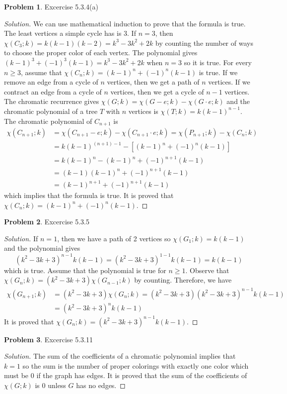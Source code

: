 \documentclass[12pt]{article}
\theoremstyle{definition}
\newtheorem{problem}{Problem}
\newenvironment*{solution}{\begin{proof}[Solution]}{\end{proof}}
\begin{document}
\begin{problem}
    Excercise 5.3.4(a)
\end{problem}
\begin{solution}
    We can use mathematical induction to prove that the formula is true.
    The least vertices a simple cycle has is 3.
    If \(n=3\), then \(\chi(C_3;k)=k(k-1)(k-2)=k^3-3k^2+2k\) by counting the
    number of ways to choose the proper color of each vertex.
    The polynomial gives \((k-1)^3+(-1)^3(k-1)=k^3-3k^2+2k\) when \(n=3\) so
    it is true.
    For every \(n\geq3\), assume that \(\chi(C_n;k) = (k-1)^n+(-1)^n(k-1)\) is
    true.
    If we remove an edge from a cycle of \(n\) vertices, then we get a path of
    \(n\) vertices.
    If we contract an edge from a cycle of \(n\) vertices, then we get a cycle
    of \(n-1\) vertices.
    The chromatic recurrence gives \(\chi(G;k)=\chi(G-e;k)-\chi(G\cdot e;k)\)
    and the chromatic polynomial of a tree \(T\) with \(n\) vertices is
    \(\chi(T;k)=k(k-1)^{n-1}\).
    The chromatic polynomial of \(C_{n+1}\) is
    \begin{align*}
        \chi(C_{n+1};k) &= \chi(C_{n+1}-e;k) - \chi(C_{n+1}\cdot e;k)
        = \chi(P_{n+1};k) - \chi(C_{n};k) \\
        &= k(k-1)^{(n+1)-1} - [(k-1)^n+(-1)^n(k-1)] \\
        &= k(k-1)^n - (k-1)^n + (-1)^{n+1}(k-1) \\
        &= (k-1)(k-1)^n + (-1)^{n+1}(k-1) \\
        &= (k-1)^{n+1} + (-1)^{n+1}(k-1)
    \end{align*}
    which implies that the formula is true.
    It is proved that \(\chi(C_n;k) = (k-1)^n+(-1)^n(k-1)\).
\end{solution}

\begin{problem}
    Excercise 5.3.5
\end{problem}
\begin{solution}
    If \(n=1\), then we have a path of 2 vertices so \(\chi(G_1;k)=k(k-1)\)
    and the polynomial gives
    \[(k^2-3k+3)^{n-1}k(k-1) = (k^2-3k+3)^{1-1}k(k-1) = k(k-1)\]
    which is true.
    Assume that the polynomial is true for \(n\geq1\).
    Observe that \(\chi(G_n;k)=(k^2-3k+3)\chi(G_{n-1};k)\) by counting.
    Therefore, we have
    \begin{align*}
        \chi(G_{n+1};k) &= (k^2-3k+3)\chi(G_{n};k)
        = (k^2-3k+3)(k^2-3k+3)^{n-1}k(k-1) \\
        &= (k^2-3k+3)^nk(k-1)
    \end{align*}
    It is proved that \(\chi(G_n;k) = (k^2-3k+3)^{n-1}k(k-1)\).
\end{solution}

\begin{problem}
    Excercise 5.3.11
\end{problem}
\begin{solution}
    The sum of the coefficients of a chromatic polynomial implies that \(k=1\)
    so the sum is the number of proper colorings with exactly one color which
    must be 0 if the graph has edges.
    It is proved that the sum of the coefficients of \(\chi(G;k)\) is 0 unless
    \(G\) has no edges.
\end{solution}
\end{document}
